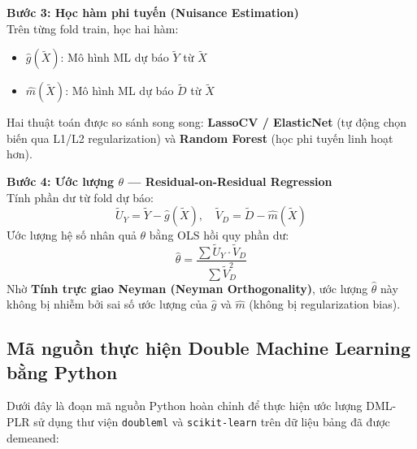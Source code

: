 \documentclass[12pt,a4paper]{article}
\begin{document}
\noindent\textbf{Bước 3: Học hàm phi tuyến (Nuisance Estimation)} \\
Trên từng fold train, học hai hàm:
\begin{itemize}
    \item $\hat{g}(\tilde{X})$: Mô hình ML dự báo $\tilde{Y}$ từ $\tilde{X}$
    \item $\hat{m}(\tilde{X})$: Mô hình ML dự báo $\tilde{D}$ từ $\tilde{X}$
\end{itemize}
Hai thuật toán được so sánh song song: \textbf{LassoCV / ElasticNet} (tự động chọn biến qua L1/L2 regularization) và \textbf{Random Forest} (học phi tuyến linh hoạt hơn).

\noindent\textbf{Bước 4: Ước lượng $\theta$ --- Residual-on-Residual Regression} \\
Tính phần dư từ fold dự báo:
\begin{equation}
\tilde{U}_Y = \tilde{Y} - \hat{g}(\tilde{X}), \quad \tilde{V}_D = \tilde{D} - \hat{m}(\tilde{X})
\end{equation}
Ước lượng hệ số nhân quả $\theta$ bằng OLS hồi quy phần dư:
\begin{equation}
\hat{\theta} = \frac{\sum \tilde{U}_Y \cdot \tilde{V}_D}{\sum \tilde{V}_D^2}
\end{equation}
Nhờ \textbf{Tính trực giao Neyman (Neyman Orthogonality)}, ước lượng $\hat{\theta}$ này không bị nhiễm bởi sai số ước lượng của $\hat{g}$ và $\hat{m}$ (không bị regularization bias).

\subsection{Mã nguồn thực hiện Double Machine Learning bằng Python}

Dưới đây là đoạn mã nguồn Python hoàn chỉnh để thực hiện ước lượng DML-PLR sử dụng thư viện \texttt{doubleml} và \texttt{scikit-learn} trên dữ liệu bảng đã được demeaned:
\end{document}
